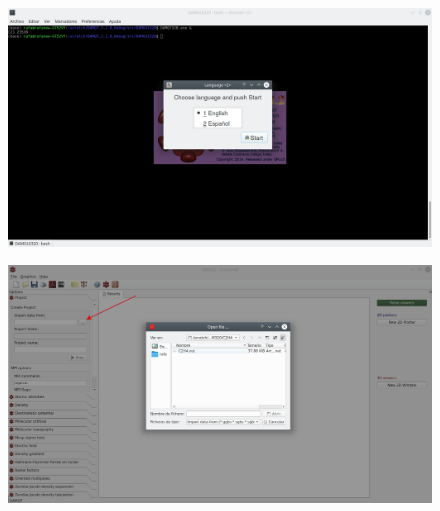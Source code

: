 \documentclass[a4paper,10pt]{article}
\begin{document}
\begin{minipage}{.5\linewidth}
\begin{figure}[H]
\caption{\label{fig:1}}
\begin{center}
\includegraphics[width=0.95\linewidth]{damqt_QS_fig1.png}
\end{center}
\end{figure} 
\end{minipage}
\begin{minipage}{.5\linewidth}
\begin{figure}[H]
\caption{\label{fig:2}}
\begin{center}
\includegraphics[width=0.95\linewidth]{damqt_QS_fig2.png}
\end{center}
\end{figure} 
\end{minipage}
\end{document}
